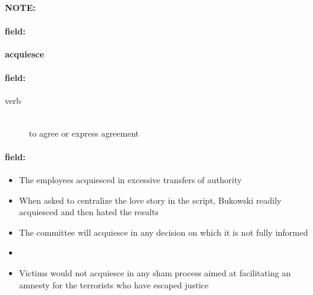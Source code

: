 \documentclass[12pt]{article}
\newenvironment{note}{\paragraph{NOTE:}}{}
\newenvironment{field}{\paragraph{field:}}{}
\begin{document}
\begin{note}
\begin{field}
\textbf{\large acquiesce}
\end{field}


\begin{field}
\begin{description}
\item[verb] \hfill \\ 
to agree or express agreement

\end{description}
\end{field}

\begin{field}
\begin{itemize}
\item The employees acquiesced in excessive transfers of authority
\item When asked to centralize the love story in the script, Bukowski readily acquiesced and then hated the results
\item The committee will acquiesce in any decision on which it is not fully informed
\item 
\item Victims would not acquiesce in any sham process aimed at facilitating an amnesty for the terrorists who have escaped justice
\end{itemize}
\end{field}
\end{note}
\end{document}
